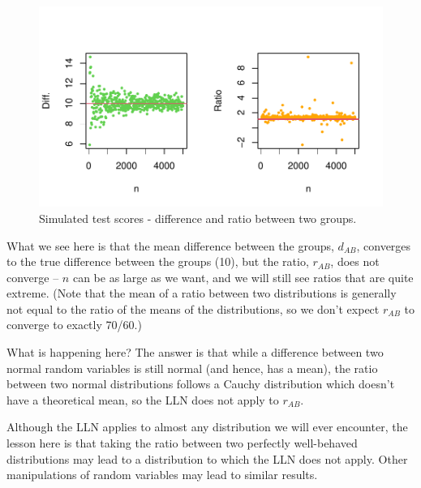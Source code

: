 \begin{knitrout}
\begin{figure}
{\centering \includegraphics[width=\maxwidth]{figure/intro-lln4-0-1} 

}

\caption[Simulated test scores - difference and ratio between two groups]{Simulated test scores - difference and ratio between two groups.}\label{fig:intro-lln4-0}
\end{figure}

\begin{kframe}\begin{alltt}
\hlstd{(}\hlstd{=}\hlstd{(}\hlstd{,}\hlstd{))}
\end{alltt}
\end{kframe}
\end{knitrout}

What we see here is that the mean difference between the groups, $d_{AB}$, converges to the true difference between the groups (10), but the ratio, $r_{AB}$, does not converge -- $n$ can be as large as we want, and we will still see ratios that are quite extreme. (Note that the mean of a ratio between two distributions is generally not equal to the ratio of the means of the distributions, so we don't expect $r_{AB}$ to converge to exactly 70/60.)

What is happening here? The answer is that while a difference between two normal random variables is still normal (and hence, has a mean), the ratio between two normal distributions follows a Cauchy distribution which doesn't have a theoretical mean, so the LLN does not apply to  $r_{AB}$.

Although the LLN applies to almost any distribution we will ever encounter, the lesson here is that taking the ratio between two perfectly well-behaved distributions may lead to a distribution to which the LLN does not apply. Other manipulations of random variables may lead to similar results.
